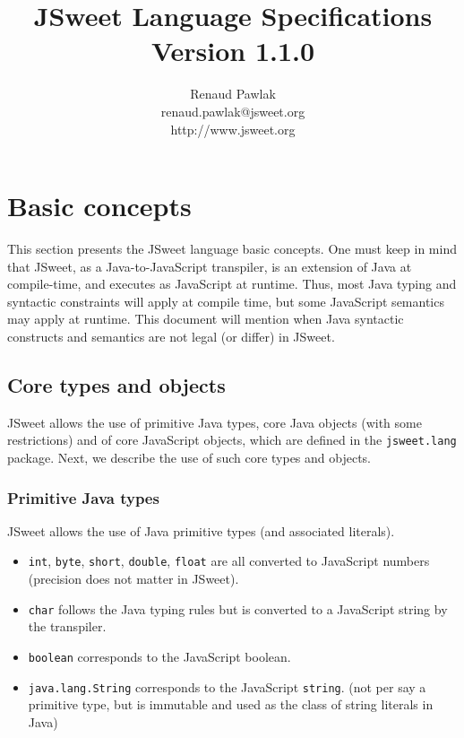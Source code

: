 \documentclass[a4paper]{report}
\begin{document}
\title{JSweet Language Specifications\\{\large Version 1.1.0}}
\author{%
Renaud Pawlak\\
{\normalsize renaud.pawlak@jsweet.org}\\
{\normalsize http://www.jsweet.org}\\
}%
\date{}
\maketitle

\tableofcontents

\chapter{Basic concepts} 

This section presents the JSweet language basic concepts. One must keep in mind that JSweet, as a Java-to-JavaScript transpiler, is an extension of Java at compile-time, and executes as JavaScript at runtime. Thus, most Java typing and syntactic constraints will apply at compile time, but some JavaScript semantics may apply at runtime. This document will mention when Java syntactic constructs and semantics are not legal (or differ) in JSweet.

\section{Core types and objects}

JSweet allows the use of primitive Java types, core Java objects (with some restrictions) and of core JavaScript objects, which are defined in the \texttt{jsweet.lang} package. Next, we describe the use of such core types and objects.

\subsection{Primitive Java types}

JSweet allows the use of Java primitive types (and associated literals).

\begin{itemize}
\item \texttt{int}, \texttt{byte}, \texttt{short}, \texttt{double}, \texttt{float} are all converted to JavaScript numbers (precision does not matter in JSweet).
\item \texttt{char} follows the Java typing rules but is converted to a JavaScript string by the transpiler.
\item \texttt{boolean} corresponds to the JavaScript boolean.
\item \texttt{java.lang.String} corresponds to the JavaScript \texttt{string}. (not per say a primitive type, but is immutable and used as the class of string literals in Java)
\end{itemize}
\end{document}
